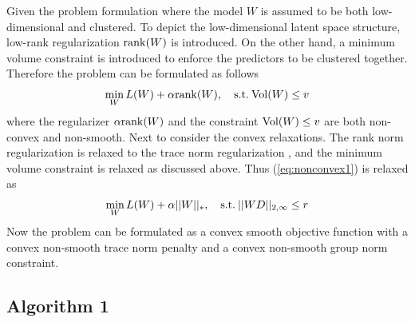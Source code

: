 \documentclass{article}
\newcounter{thm_counter}
\newcounter{lem_counter}
\newcounter{pro_counter}
\newcounter{ass_counter}
\begin{document}
Given the problem formulation where the model $W$ is assumed to be both low-dimensional and clustered.
To depict the low-dimensional latent space structure, low-rank regularization ${\rm {rank}}(W)$
is introduced. On the other hand, a minimum volume constraint is introduced to enforce the predictors to be clustered together.
Therefore the problem can be formulated as follows
\begin{equation}
\mathop {\min }\limits_W L(W) + \alpha {\rm{rank}}(W),\quad{\rm{s.t.}}\:{\rm{Vol}}(W) \le v
\label{eq:nonconvex1}
\end{equation}
where the regularizer $\alpha{\rm {rank}}(W)$ and the constraint
${\rm {Vol(}}W{\rm {)}}\le v$ are both non-convex and non-smooth.
Next to consider the convex relaxations.
The rank norm regularization is relaxed to the trace norm regularization \cite{ji2009accelerated},
and the minimum volume constraint is relaxed as discussed
above. Thus (\ref{eq:nonconvex1}) is relaxed as
%
\begin{equation}
{\mathop {\min }\limits_W L(W) + \alpha ||W|{|_*},\quad{\rm{s.t.}}\:||WD|{|_{2,\infty }} \le r}
\label{eq:nc1-2}
\end{equation}
%
Now the problem can be formulated as a convex smooth objective function
with a convex non-smooth trace norm penalty and a convex non-smooth
group norm constraint. 

\subsection{Algorithm 1}
\end{document}
